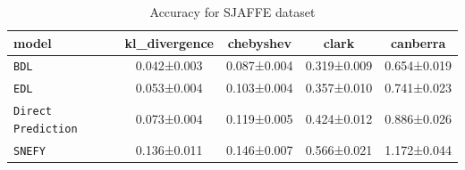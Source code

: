 \begin{table}[h]
\centering
\caption{Accuracy for SJAFFE dataset}
\label{tab:sjaffe_accuracy}

\begin{tabular}{lcccc}
\toprule
\textbf{model} & \textbf{kl\_divergence} & \textbf{chebyshev} & \textbf{clark} & \textbf{canberra} \\
\midrule
\texttt{BDL} & 0.042±0.003 & 0.087±0.004 & 0.319±0.009 & 0.654±0.019 \\
\texttt{EDL} & 0.053±0.004 & 0.103±0.004 & 0.357±0.010 & 0.741±0.023 \\
\texttt{Direct Prediction} & 0.073±0.004 & 0.119±0.005 & 0.424±0.012 & 0.886±0.026 \\
\texttt{SNEFY} & 0.136±0.011 & 0.146±0.007 & 0.566±0.021 & 1.172±0.044 \\
\bottomrule
\end{tabular}

\end{table}